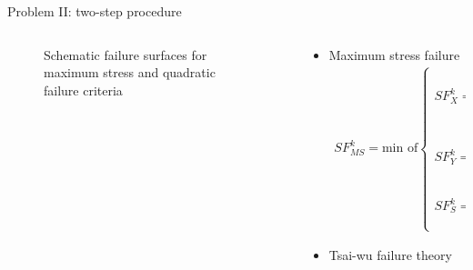 \documentclass{beamer}
\begin{document}
\begin{frame}{Problem II: two-step procedure}
\begin{columns}[c]
    \begin{column}{0.4\textwidth}
		\begin{figure}
		\centering
		\caption{Schematic failure surfaces for maximum stress and quadratic failure
		criteria}
		\end{figure}
    \end{column}
    \begin{column}{0.6\textwidth}
		\begin{itemize}
			\item  Maximum stress failure
				\begingroup
				\small
				\begin{align*}
					SF_{MS}^k = \text{min of}
					\begin{cases}
						SF_X^k = 
						\begin{cases}
							\frac{X_t}{\sigma_{11}}, \text{ if } \sigma_{11}>0 \\
							\frac{X_c}{\sigma_{11}}, \text{ if } \sigma_{11}<0 \\
						\end{cases} \\
						SF_Y^k = 
						\begin{cases}
							\frac{Y_t}{\sigma_{22}}, \text{ if } \sigma_{22}>0 \\
							\frac{Y_c}{\sigma_{22}}, \text{ if } \sigma_{22}<0 \\
						\end{cases} \\
						SF_S^k =
						\begin{cases}
							\frac{S}{|\tau_{12}|} \\
						\end{cases} \\
					\end{cases} \textstyle{.}
				\end{align*}
				\endgroup
			\item  Tsai-wu failure theory


\end{itemize}
\end{column}
\end{columns}
\end{frame}
\end{document}
